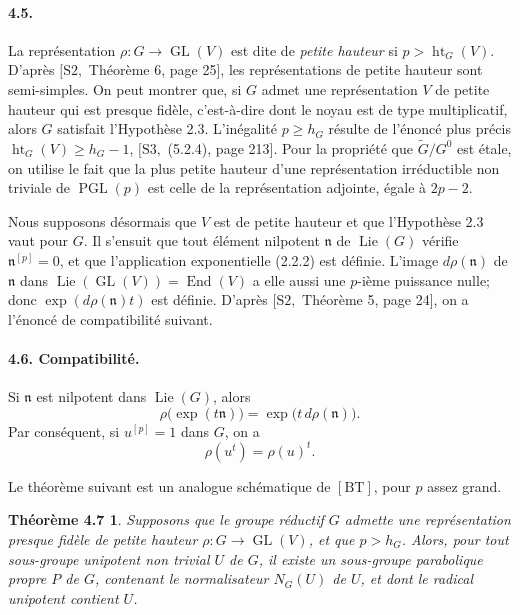 \documentclass[11pt]{article}
\newcommand{\Lie}{\operatorname{Lie}}
\newcommand{\GL}{\operatorname{GL}}
\newcommand{\htG}{\operatorname{ht}_G}
\newcommand{\PGL}{\operatorname{PGL}}
\newcommand{\End}{\operatorname{End}}
\newtheorem*{theoreme47}{Théorème 4.7}
\begin{document}
\paragraph{4.5.}
La représentation \(\rho:G\to\GL(V)\) est dite de \emph{petite hauteur} si
\(p>\htG(V)\). D'après \([\mathrm{S2},\) Théorème 6, page 25], les représentations de
petite hauteur sont semi-simples. On peut montrer que, si \(G\) admet une représentation
\(V\) de petite hauteur qui est presque fidèle, c'est-à-dire dont le noyau est de type
multiplicatif, alors \(G\) satisfait l'Hypothèse 2.3. L'inégalité \(p\ge h_G\) résulte de
l'énoncé plus précis \(\htG(V)\ge h_G-1\), \([\mathrm{S3},\) (5.2.4), page 213]. Pour
la propriété que \(\widetilde G/G^0\) est étale, on utilise le fait que la plus petite
hauteur d'une représentation irréductible non triviale de \(\PGL(p)\) est celle de la
représentation adjointe, égale à \(2p-2\).

Nous supposons désormais que \(V\) est de petite hauteur et que l'Hypothèse 2.3 vaut
pour \(G\). Il s'ensuit que tout élément nilpotent \(\mathfrak n\) de \(\Lie(G)\) vérifie
\(\mathfrak n^{[p]}=0\), et que l'application exponentielle (2.2.2) est définie. L'image
\(d\rho(\mathfrak n)\) de \(\mathfrak n\) dans \(\Lie(\GL(V))=\End(V)\) a elle aussi une
\(p\)-ième puissance nulle; donc \(\exp(d\rho(\mathfrak n)t)\) est définie. D'après
\([\mathrm{S2},\) Théorème 5, page 24], on a l'énoncé de compatibilité suivant.

\paragraph{4.6. Compatibilité.}
Si \(\mathfrak n\) est nilpotent dans \(\Lie(G)\), alors
\begin{equation}
  \rho\bigl(\exp(t\mathfrak n)\bigr)=\exp\bigl(t\,d\rho(\mathfrak n)\bigr).
  \tag{4.6.1}
\end{equation}
Par conséquent, si \(u^{[p]}=1\) dans \(G\), on a
\begin{equation}
  \rho(u^t)=\rho(u)^t.
  \tag{4.6.2}
\end{equation}

Le théorème suivant est un analogue schématique de \([\mathrm{BT}]\), pour \(p\) assez
grand.

\begin{theoreme47}
Supposons que le groupe réductif \(G\) admette une représentation presque fidèle de
petite hauteur \(\rho:G\to\GL(V)\), et que \(p>h_G\). Alors, pour tout sous-groupe
unipotent non trivial \(U\) de \(G\), il existe un sous-groupe parabolique propre \(P\) de
\(G\), contenant le normalisateur \(N_G(U)\) de \(U\), et dont le radical unipotent contient
\(U\).
\end{theoreme47}
\end{document}

